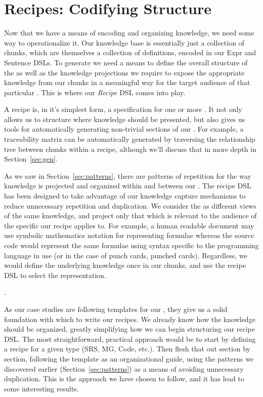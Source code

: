 \section{Recipes: Codifying Structure}
\label{sec:recipes}

Now that we have a means of encoding and organizing knowledge, we need some 
way to operationalize it. Our knowledge base is essentially just a collection 
of chunks, which are themselves a collection of definitions, encoded in our 
Expr and Sentence DSLs. To generate \sfs{} we need a means to define the 
overall structure of the \sf{} as well as the knowledge projections we require 
to expose the appropriate knowledge from our chunks in a meaningful way for the 
target audience of that particular \sf{}. This is where our \emph{Recipe} DSL 
comes into play.

A recipe is, in it's simplest form, a specification for one or more \sfs{}. 
It not only allows us to structure where knowledge should be presented, but 
also gives us tools for automatically generating non-trivial sections of our 
\sfs{}. For example, a traceability matrix can be automatically generated 
by traversing the relationship tree between chunks within a recipe, although 
we'll discuss that in more depth in Section~\ref{sec:gen}.

As we saw in Section~\ref{sec:patterns}, there are patterns of repetition for 
the way knowledge is projected and organized within and between our \sfs{}. The 
recipe DSL has been designed to take advantage of our knowledge capture 
mechanisms to reduce unnecessary repetition and duplication. We consider the 
\sfs{} as different views of the same knowledge, and project only that which is 
relevant to the audience of the specific \sf{} our recipe applies to. For 
example, a human readable document may use symbolic mathematics notation for 
representing formulae whereas the source code would represent the same formulae 
using syntax specific to the programming language in use (or in the case of 
punch cards, punched cards). Regardless, we would define the underlying 
knowledge once in our chunks, and use the recipe DSL to select the 
representation.

.

As our case studies are following templates for our \sfs{}, they give us a 
solid foundation with which to write our recipes. We already know how the 
knowledge should be organized, greatly simplifying how we can begin structuring 
our recipe DSL. The most straightforward, practical approach would be to start 
by defining a recipe for a given \sf{} type (SRS, MG, Code, etc.). Then flesh 
that out section by section, following the template as an organizational guide, 
using the patterns we discovered earlier (Section~\ref{sec:patterns}) as a 
means of avoiding unnecessary duplication. This is the approach we have chosen 
to follow, and it has lead to some interesting results.

